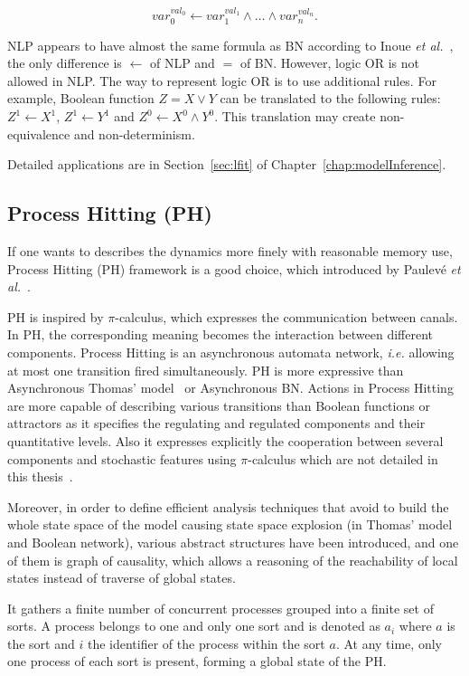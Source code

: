$$var_0^{val_0} \gets var_1^{val_1}\land \ldots \land var_n^{val_n}.$$

\begin{remark}
NLP appears to have almost the same formula as BN according to Inoue \textit{et al.}~\cite{inoue2011logic}, the only difference is $\gets$ of NLP and $=$ of BN.
However, logic OR is not allowed in NLP.
The way to represent logic OR is to use additional rules.
For example, Boolean function $Z=X\lor Y$ can be translated to the following rules: $Z^1\gets X^1$, $Z^1\gets Y^1$ and $Z^0\gets X^0\land Y^0$.
This translation may create non-equivalence and non-determinism.
\end{remark}

Detailed applications are in Section~\ref{sec:lfit} of Chapter~\ref{chap:modelInference}.

\subsection{Process Hitting (PH)}
If one wants to describes the dynamics more finely with reasonable memory use, Process Hitting (PH) framework is a good choice, which introduced by Paulev\'e \textit{et al.}~\cite{pauleve2011}.

PH is inspired by $\pi$-calculus, which expresses the communication between canals. 
In PH, the corresponding meaning becomes the interaction between different components.
Process Hitting is an asynchronous automata network, \textit{i.e.} allowing at most one transition fired simultaneously. 
PH is more expressive than Asynchronous Thomas' model~\cite{thomas1978} or Asynchronous BN. 
Actions in Process Hitting are more capable of describing various transitions than Boolean functions or attractors as it specifies the regulating and regulated components and their quantitative levels.
Also it expresses explicitly the cooperation between several components and stochastic features using $\pi$-calculus which are not detailed in this thesis~\cite{pauleve2014}.

Moreover, in order to define efficient analysis techniques that avoid to build the whole state space of the model causing state space explosion (in Thomas' model and Boolean network), various abstract structures have been introduced, and one of them is graph of causality, which allows a reasoning of the reachability of local states instead of traverse of global states.

It gathers a finite number of concurrent processes grouped into a finite set of sorts. A process belongs to one and only one sort and is denoted as $a_i$ where $a$ is the sort and $i$ the identifier of the process within the sort $a$.
At any time, only one process of each sort is present, forming a global state of the PH.

